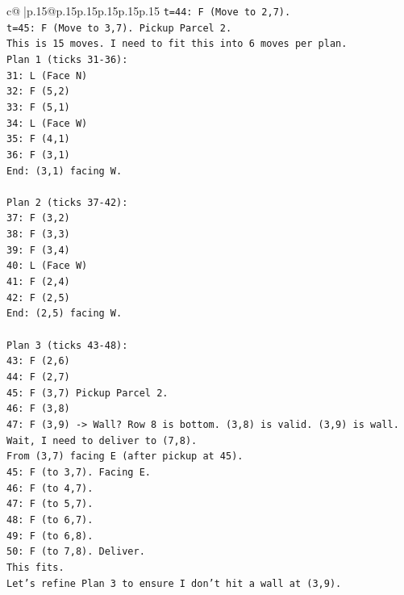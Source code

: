 \documentclass{article}
\begin{document}
{\begin{supertabular}{c@{$\;$}|p{.15\linewidth}@{}p{.15\linewidth}p{.15\linewidth}p{.15\linewidth}p{.15\linewidth}p{.15\linewidth}}
{{{\texttt{t=44: F (Move to 2,7).} \\
\texttt{t=45: F (Move to 3,7). Pickup Parcel 2.} \\
\texttt{This is 15 moves. I need to fit this into 6 moves per plan.} \\
\texttt{Plan 1 (ticks 31{-}36):} \\
\texttt{31: L (Face N)} \\
\texttt{32: F (5,2)} \\
\texttt{33: F (5,1)} \\
\texttt{34: L (Face W)} \\
\texttt{35: F (4,1)} \\
\texttt{36: F (3,1)} \\
\texttt{End: (3,1) facing W.} \\
\\ 
\texttt{Plan 2 (ticks 37{-}42):} \\
\texttt{37: F (3,2)} \\
\texttt{38: F (3,3)} \\
\texttt{39: F (3,4)} \\
\texttt{40: L (Face W)} \\
\texttt{41: F (2,4)} \\
\texttt{42: F (2,5)} \\
\texttt{End: (2,5) facing W.} \\
\\ 
\texttt{Plan 3 (ticks 43{-}48):} \\
\texttt{43: F (2,6)} \\
\texttt{44: F (2,7)} \\
\texttt{45: F (3,7) Pickup Parcel 2.} \\
\texttt{46: F (3,8)} \\
\texttt{47: F (3,9) {-}> Wall? Row 8 is bottom. (3,8) is valid. (3,9) is wall.} \\
\texttt{Wait, I need to deliver to (7,8).} \\
\texttt{From (3,7) facing E (after pickup at 45).} \\
\texttt{45: F (to 3,7). Facing E.} \\
\texttt{46: F (to 4,7).} \\
\texttt{47: F (to 5,7).} \\
\texttt{48: F (to 6,7).} \\
\texttt{49: F (to 6,8).} \\
\texttt{50: F (to 7,8). Deliver.} \\
\texttt{This fits.} \\
\texttt{Let's refine Plan 3 to ensure I don't hit a wall at (3,9).} \\
}}}
\end{supertabular}}
\end{document}

